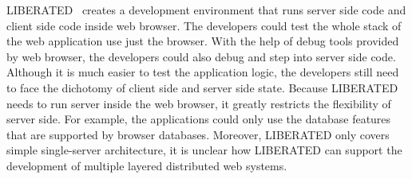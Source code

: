 LIBERATED~\cite{lipman2011liberated} creates a development environment that runs server side code and 
client side code inside web browser.
The developers could test the whole stack of the web application use just the browser.
With the help of \js{} debug tools provided by web browser, the developers could also
debug and step into server side code.
Although it is much easier to test the application logic,
the developers still need to face the dichotomy of client side and server side state.
Because LIBERATED needs to run server inside the web browser,
it greatly restricts the flexibility of server side.
For example, the applications could only use the database features that are supported by
browser databases.
Moreover, LIBERATED only covers simple single-server architecture, 
it is unclear how LIBERATED can support the development of multiple layered distributed web systems.



